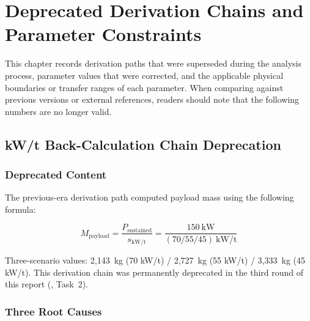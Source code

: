 
\section{Deprecated Derivation Chains and Parameter Constraints}

This chapter records derivation paths that were superseded during the analysis process, parameter values that were corrected, and the applicable physical boundaries or transfer ranges of each parameter. When comparing against previous versions or external references, readers should note that the following numbers are no longer valid.

\subsection{kW/t Back-Calculation Chain Deprecation}
\label{sec:deprecated-kwt}

\subsubsection{Deprecated Content}

The previous-era derivation path computed payload mass using the following formula:

\begin{equation}
  M_{\mathrm{payload}} = \frac{P_{\mathrm{sustained}}}{s_{\mathrm{kW/t}}}
                       = \frac{150\ \mathrm{kW}}{(70/55/45)\ \mathrm{kW/t}}
  \label{eq:deprecated-kwt}
\end{equation}

Three-scenario values: 2,143~kg (70 kW/t) / 2,727~kg (55 kW/t) / 3,333~kg (45 kW/t). This derivation chain was permanently deprecated in the third round of this report (, Task~2).

\subsubsection{Three Root Causes}

